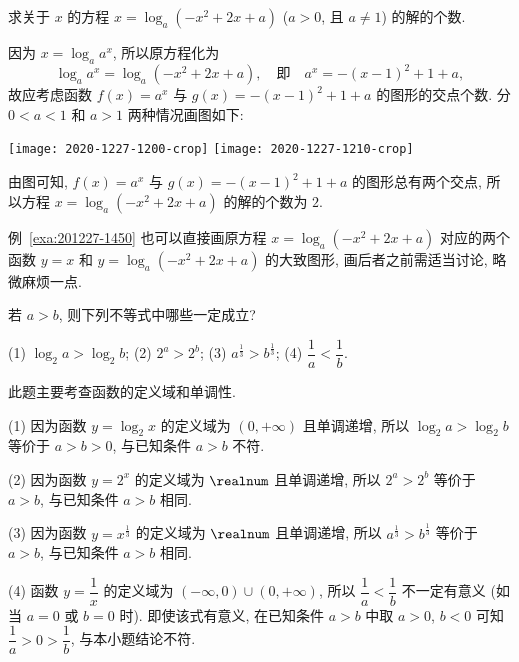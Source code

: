 \begin{example}\label{exa:201227-1450}
    求关于 $x$ 的方程 $x=\log_a (-x^2 +2x+a)$ ($a>0$, 且 $a\neq 1$) 的解的个数.
\end{example}
\begin{solution}
    因为 $x=\log_a a^x$, 所以原方程化为
    \[\log_a a^x=\log_a (-x^2 +2x+a),\quad\text{即}\quad
        a^x= -(x-1)^2 +1+a,\]
    故应考虑函数 $f(x)=a^x$ 与 $g(x)= -(x-1)^2 +1+a$ 的图形的交点个数. 分 $0<a<1$ 和 $a>1$ 两种情况画图如下:
    
    \begin{center}
        \texttt{[image: 2020-1227-1200-crop]}\qquad
        \texttt{[image: 2020-1227-1210-crop]}
    \end{center}
    
    由图可知, $f(x)=a^x$ 与 $g(x)= -(x-1)^2 +1+a$ 的图形总有两个交点, 所以方程 $x=\log_a (-x^2 +2x+a)$ 的解的个数为 $2$.
\end{solution}

例~\ref{exa:201227-1450} 也可以直接画原方程 $x=\log_a (-x^2 +2x+a)$ 对应的两个函数 $y=x$ 和 $y=\log_a (-x^2 +2x+a)$ 的大致图形, 画后者之前需适当讨论, 略微麻烦一点.

\begin{example}
    若 $a>b$, 则下列不等式中哪些一定成立?
    
    (1) $\log_2 a> \log_2 b$;\quad 
    (2) $2^a> 2^b$;\quad 
    (3) $a^{\frac13}> b^{\frac13}$;\quad
    (4) $\dfrac1a<\dfrac1b$.
\end{example}
\begin{solution}
    此题主要考查函数的定义域和单调性.
    
    (1) 因为函数 $y=\log_2 x$ 的定义域为 $(0,+\infty)$ 且单调递增, 所以 $\log_2 a> \log_2 b$ 等价于 $a>b>0$, 与已知条件 $a>b$ 不符.
    
    (2) 因为函数 $y= 2^x$ 的定义域为 $\realnum$ 且单调递增, 所以 $2^a> 2^b$ 等价于 $a>b$, 与已知条件 $a>b$ 相同.
    
    (3) 因为函数 $y= x^{\frac13}$ 的定义域为 $\realnum$ 且单调递增, 所以 $a^{\frac13}> b^{\frac13}$ 等价于 $a>b$, 与已知条件 $a>b$ 相同.
    
    (4) 函数 $y=\dfrac1x$ 的定义域为 $(-\infty,0)\cup(0,+\infty)$, 所以 $\dfrac1a<\dfrac1b$ 不一定有意义 (如当 $a=0$ 或 $b=0$ 时). 即使该式有意义, 在已知条件 $a>b$ 中取 $a>0$, $b<0$ 可知 $\dfrac1a>0>\dfrac1b$, 与本小题结论不符.
\end{solution}


